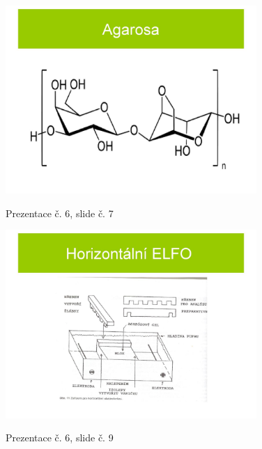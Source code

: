\documentclass[DIV=8]{scrreprt}
\begin{document}
\begin{figure}
    \caption{Prezentace č. 6, slide č. 7}
    \includegraphics[width=0.85\textwidth]{slides-6/slide-7.jpg}
    \centering
    \label{slides-6-slide-7}
\end{figure}
\begin{figure}
    \caption{Prezentace č. 6, slide č. 9}
    \includegraphics[width=0.85\textwidth]{slides-6/slide-9.jpg}
    \centering
    \label{slides-6-slide-9}
\end{figure}
\end{document}
